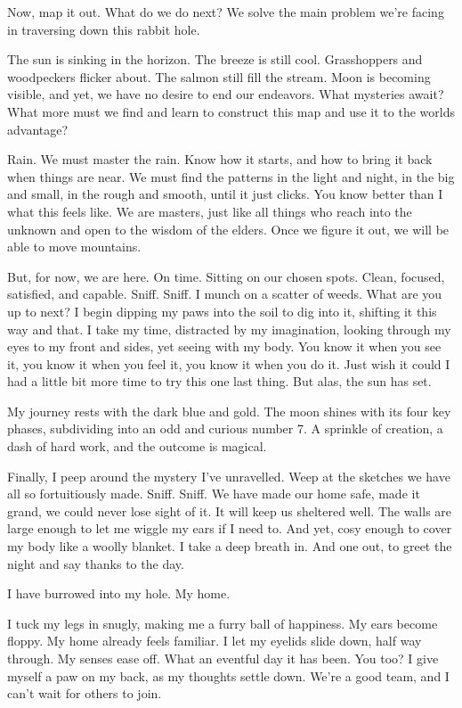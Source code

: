 Now, map it out. What do we do next? We solve the main problem we're
facing in traversing down this rabbit hole.

The sun is sinking in the horizon. The breeze is still cool.
Grasshoppers and woodpeckers flicker about. The salmon still fill the
stream. Moon is becoming visible, and yet, we have no desire to end our
endeavors. What mysteries await? What more must we find and learn to
construct this map and use it to the worlds advantage?

Rain. We must master the rain. Know how it starts, and how to bring it
back when things are near. We must find the patterns in the light and
night, in the big and small, in the rough and smooth, until it just
clicks. You know better than I what this feels like. We are masters,
just like all things who reach into the unknown and open to the wisdom
of the elders. Once we figure it out, we will be able to move mountains.

But, for now, we are here. On time. Sitting on our chosen spots. Clean,
focused, satisfied, and capable. Sniff. Sniff. I munch on a scatter of
weeds. What are you up to next? I begin dipping my paws into the soil to
dig into it, shifting it this way and that. I take my time, distracted
by my imagination, looking through my eyes to my front and sides, yet
seeing with my body. You know it when you see it, you know it when you
feel it, you know it when you do it. Just wish it could I had a little
bit more time to try this one last thing. But alas, the sun has set.

My journey rests with the dark blue and gold. The moon shines with its
four key phases, subdividing into an odd and curious number 7. A
sprinkle of creation, a dash of hard work, and the outcome is magical.

Finally, I peep around the mystery I've unravelled. Weep at the sketches
we have all so fortuitiously made. Sniff. Sniff. We have made our home
safe, made it grand, we could never lose sight of it. It will keep us
sheltered well. The walls are large enough to let me wiggle my ears if I
need to. And yet, cosy enough to cover my body like a woolly blanket. I
take a deep breath in. And one out, to greet the night and say thanks to
the day.

I have burrowed into my hole. My home.

I tuck my legs in snugly, making me a furry ball of happiness. My ears
become floppy. My home already feels familiar. I let my eyelids slide
down, half way through. My senses ease off. What an eventful day it has
been. You too? I give myself a paw on my back, as my thoughts settle
down. We're a good team, and I can't wait for others to join.

